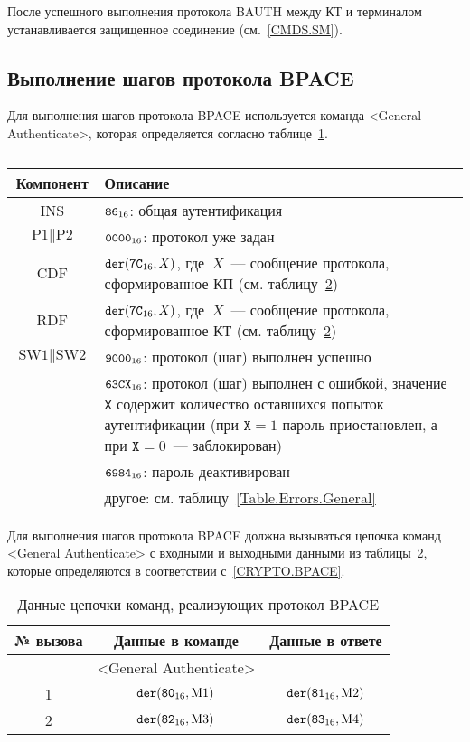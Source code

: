 После успешного выполнения протокола BAUTH между КТ и терминалом 
устанавливается защищенное соединение (см.~\ref{CMDS.SM}).

\subsection{Выполнение шагов протокола BPACE}
\label{Oper.Descr.GABPACE} 

Для выполнения шагов протокола BPACE 
используется команда <General Authenticate>,
которая определяется согласно 
таблице~\ref{Table.Oper.GABPACECmd}.

\begin{table}[hbt]
\caption{}\label{Table.Oper.GABPACECmd}
\begin{tabular}{|c|p{14cm}|}
\hline
Компонент & 	Описание \\
\hline
\hline
INS & $\texttt{86}_{16}$: общая аутентификация \\
\hline
$\text{P1} \parallel \text{P2}$ & $\texttt{0000}_{16}$: протокол уже задан\\ 
\hline
CDF & $\texttt{der}(\texttt{7C}_{16}, X)$, 
где~$X$~--- сообщение протокола, сформированное КП (см. 
таблицу~\ref{Table.Oper.BPACE})\\ 
\hline 
RDF & $\texttt{der}(\texttt{7C}_{16}, X)$, где~$X$~--- 
сообщение протокола, сформированное КТ (см. таблицу~\ref{Table.Oper.BPACE})\\
\hline
$\text{SW1} \parallel \text{SW2}$ & 
  $\texttt{9000}_{16}$: протокол (шаг) выполнен успешно \\
  & $\texttt{63CX}_{16}$: протокол (шаг) выполнен с ошибкой, 
значение \texttt{X} содержит количество оставшихся попыток аутентификации 
(при $\texttt{X} = 1$ пароль приостановлен, а при $\texttt{X} = 0$~--- 
заблокирован) \\
  & $\texttt{6984}_{16}$: пароль деактивирован \\
  & другое: см. таблицу~\ref{Table.Errors.General} \\
\hline
\end{tabular}
\end{table}

Для выполнения шагов протокола BPACE должна вызываться цепочка 
команд <General Authenticate> с входными и выходными данными 
из таблицы~\ref{Table.Oper.BPACE}, 
которые определяются в соответствии с~\ref{CRYPTO.BPACE}. 

\begin{table}[hbt]
\caption{Данные цепочки команд, реализующих протокол BPACE}
\label{Table.Oper.BPACE}
\begin{tabular}{|c|c|c|}
\hline
№ вызова & Данные в команде & Данные в ответе\\
\hline
\hline
 & <General Authenticate> &  \\
\hline
\hline
1 & $\texttt{der}(\texttt{80}_{16}, \text{M1})$ & 
$\texttt{der}(\texttt{81}_{16}, \text{M2})$\\
\hline
2 & $\texttt{der}(\texttt{82}_{16}, \text{M3})$ & 
$\texttt{der}(\texttt{83}_{16}, \text{M4})$\\
\hline
\end{tabular}
\end{table}

